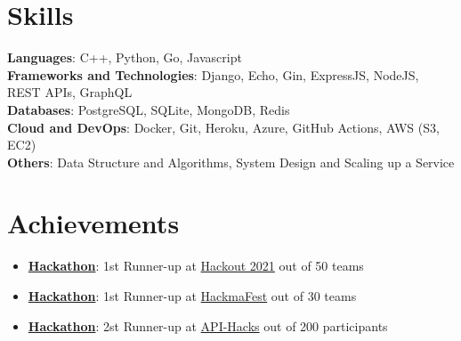 \documentclass[letterpaper,11pt]{article}
\newcommand{\resumeItem}[1]{
  \item\small{
    {#1 \vspace{-2pt}}
  }
}
\newcommand{\resumeItemListStart}{\begin{itemize}}
\newcommand{\resumeItemListEnd}{\end{itemize}\vspace{-5pt}}
\begin{document}
\section{Skills}
 \begin{itemize}[leftmargin=0.15in, label={}]
    \small{\item{
     \textbf{Languages}{: C++, Python, Go, Javascript} \\
     \textbf{Frameworks and Technologies}{: Django, Echo, Gin, ExpressJS, NodeJS, REST APIs, GraphQL} \\
     \textbf{Databases}{: PostgreSQL, SQLite, MongoDB, Redis} \\
     \textbf{Cloud and DevOps}{: Docker, Git, Heroku, Azure, GitHub Actions, AWS (S3, EC2)} \\
     \textbf{Others}{: Data Structure and Algorithms, System Design and Scaling up a Service}\\
    }}
 \end{itemize}

\section{Achievements}
 \begin{itemize}[leftmargin=0.15in, label={}]
    \small{\item{
        \resumeItemListStart
                \resumeItem{\textbf{\href{Link if any}{Hackathon}}: 1st Runner-up at \href{https://www.hackout.io/}{Hackout 2021} out of 50 teams}
                \resumeItem{\textbf{\href{Link if any}{Hackathon}}: 1st Runner-up at \href{https://hackmafest.tech/}{HackmaFest} out of 30 teams}
                \resumeItem{\textbf{\href{Link if any}{Hackathon}}: 2st Runner-up at \href{https://apihacks.co/}{API-Hacks} out of 200 participants}
      \resumeItemListEnd
    }}
 \end{itemize}
\end{document}
